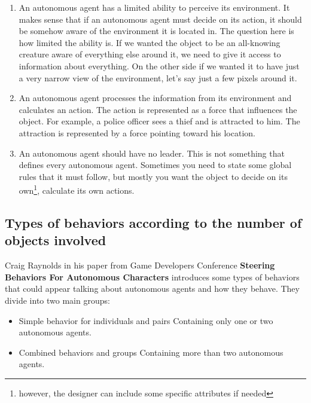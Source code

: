 \documentclass[10pt,twoside,english,a4paper]{article}
\begin{document}
\begin{enumerate}
    \item An autonomous agent has a limited ability to perceive its 
    environment. It makes sense that if an autonomous agent must decide 
    on its action, it should be somehow aware of the environment it 
    is located in. The question here is how limited the ability is. 
    If we wanted the object to be an all-knowing creature aware of 
    everything else around it, we need to give it access to 
    information about everything. On the other side if we wanted it 
    to have just a very narrow view of the environment, let’s say just 
    a few pixels around it.
    
    \item An autonomous agent processes the information from its 
    environment and calculates an action. The action is represented 
    as a force that influences the object. For example, a police 
    officer sees a thief and is attracted to him. The attraction is 
    represented by a force pointing toward his location. 
    
    \item An autonomous agent should have no leader. This is not 
    something that defines every autonomous agent. Sometimes you need 
    to state some global rules that it must follow, but mostly you want 
    the object to decide on its own\footnote{however, the designer can 
    include some specific attributes if needed}, calculate its own 
    actions.

\end{enumerate}

\subsection{Types of behaviors according to the number of objects 
involved} \label{types of behaviors}

Craig Raynolds in his paper from Game Developers Conference 
\textbf{Steering Behaviors For Autonomous Characters} \cite{Raynolds} 
introduces some types of behaviors that could appear talking about 
autonomous agents and how they behave. They divide into two main 
groups:

\begin{itemize}

\item Simple behavior for individuals and pairs\newline
Containing only one or two autonomous agents.

\item Combined behaviors and groups\newline
Containing more than two autonomous agents.

\end{itemize}
\end{document}
